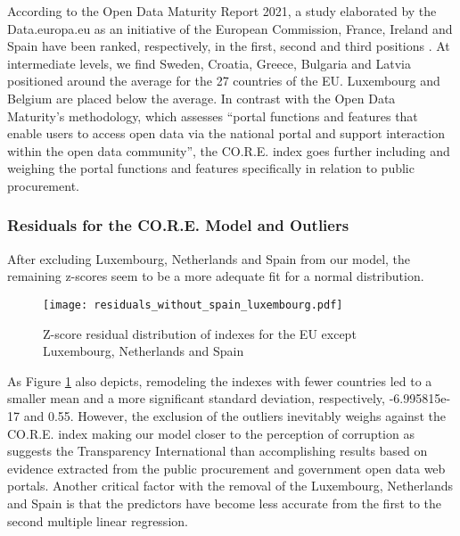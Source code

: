 \documentclass[a4paper, twoside]{report}
\begin{document}
According to the Open Data Maturity Report 2021, a study elaborated by the Data.europa.eu as an initiative of the European Commission, France, Ireland and Spain have been ranked, respectively, in the first, second and third positions \citep[p. 5]{open_data_maturity}. At intermediate levels, we find Sweden, Croatia, Greece, Bulgaria and Latvia positioned around the average for the 27 countries of the EU. Luxembourg and Belgium are placed below the average. In contrast with the Open Data Maturity's methodology, which assesses ``portal functions and features that enable users to access open data via the national portal and support interaction within the open data community'', the CO.R.E. index goes further including and weighing the portal functions and features specifically in relation to public procurement.\\

\subsubsection{Residuals for the CO.R.E. Model and Outliers}

After excluding Luxembourg, Netherlands and Spain from our model, the remaining z-scores seem to be a more adequate fit for a normal distribution.\\


\begin{figure}[H]
\centering
	\caption{Z-score residual distribution of indexes for the EU except Luxembourg, Netherlands and Spain}
	\texttt{[image: residuals\_without\_spain\_luxembourg.pdf]}
	\label{fig:residuals_without_spain_luxembourg}
\end{figure}

As Figure \ref{fig:residuals_without_spain_luxembourg} also depicts, remodeling the indexes with fewer countries led to a smaller mean and a more significant standard deviation, respectively, -6.995815e-17 and 0.55. However, the exclusion of the outliers inevitably weighs against the CO.R.E. index making our model closer to the perception of corruption as suggests the Transparency International than accomplishing results based on evidence extracted from the public procurement and government open data web portals. Another critical factor with the removal of the Luxembourg, Netherlands and Spain is that the predictors have become less accurate from the first to the second multiple linear regression.\\
\end{document}
